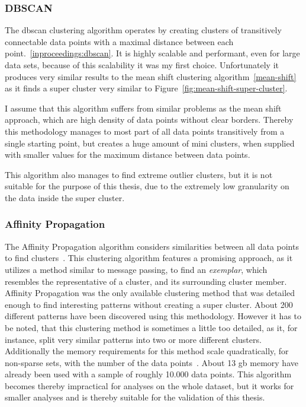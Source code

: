 \subsubsection{DBSCAN}
The \ac{dbscan} clustering algorithm operates by creating clusters of transitively connectable data points with a maximal distance between each point.~\ref{inproceedings:dbscan}.
It is highly scalable and performant, even for large data sets, because of this scalability it was my first choice.
Unfortunately it produces very similar results to the mean shift clustering algorithm~\ref{mean-shift} as it finds a super cluster very similar to Figure~\ref{fig:mean-shift-super-cluster}.

I assume that this algorithm suffers from similar problems as the mean shift approach, which are high density of data points without clear borders.
Thereby this methodology manages to most part of all data points transitively from a single starting point, but creates a huge amount of mini clusters, when supplied with smaller values for the maximum distance between data points.

This algorithm also manages to find extreme outlier clusters, but it is not suitable for the purpose of this thesis, due to the extremely low granularity on the data inside the super cluster.


\subsubsection{Affinity Propagation}
The Affinity Propagation algorithm considers similarities between all data points to find clusters~\cite{article:affinity-propagation}.
This clustering algorithm features a promising approach, as it utilizes a method similar to message passing, to find an \emph{exemplar}, which resembles the representative of a cluster, and its surrounding cluster member.
Affinity Propagation was the only available clustering method that was detailed enough to find interesting patterns without creating a super cluster.
About 200 different patterns have been discovered using this methodology.
However it has to be noted, that this clustering method is sometimes a little too detailed, as it, for instance, split very similar patterns into two or more different clusters.
Additionally the memory requirements for this method scale quadratically, for non-sparse sets, with the number of the data points~\cite[p.~ii]{article:affinity-propagation}.
About 13 \ac{gb} memory have already been used with a sample of roughly 10.000 data points.
This algorithm becomes thereby impractical for analyses on the whole dataset, but it works for smaller analyses and is thereby suitable for the validation of this thesis.
